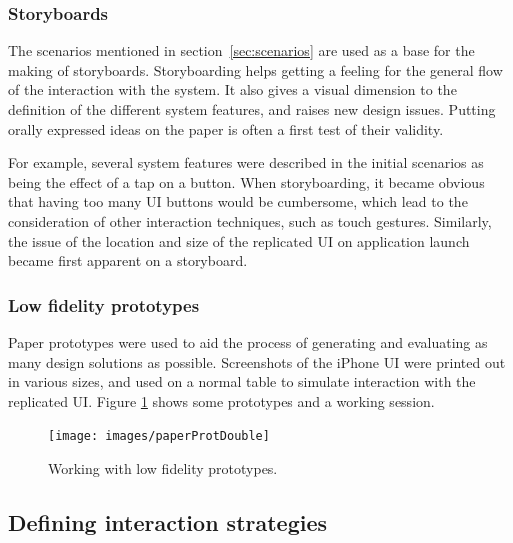 \subsubsection{Storyboards}

The scenarios mentioned in section~\ref{sec:scenarios} are used as a base for the making of storyboards.
Storyboarding helps getting a feeling for the general flow of the interaction with the system.
It also gives a visual dimension to the definition of the different system features, and raises new design issues.
Putting orally expressed ideas on the paper is often a first test of their validity.

For example, several system features were described in the initial scenarios as being the effect of a tap on a button.
When storyboarding, it became obvious that having too many UI buttons would be cumbersome, which lead to the consideration of other interaction techniques, such as touch gestures.
Similarly, the issue of the location and size of the replicated UI on application launch became first apparent on a storyboard.

\subsubsection{Low fidelity prototypes}

Paper prototypes were used to aid the process of generating and evaluating as many design solutions as possible.
Screenshots of the iPhone UI \citep{iphone} were printed out in various sizes, and used on a normal table to simulate interaction with the replicated UI.
Figure \ref{paperProt} shows some prototypes and a working session.

\begin{figure}[htb]
  \centering
    \texttt{[image: images/paperProtDouble]}
  \caption{Working with low fidelity prototypes.}
  \label{paperProt}
\end{figure}



\subsection{Defining interaction strategies}
\label{sec:strategies}

